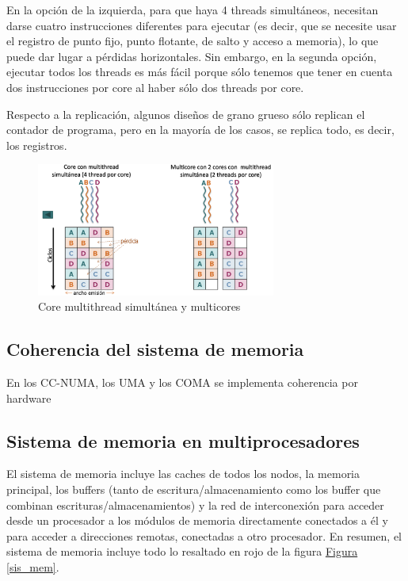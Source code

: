 \documentclass[10pt,a4paper,spanish]{report}
\begin{document}
En la opción de la izquierda, para que haya 4 threads simultáneos, necesitan darse cuatro instrucciones diferentes para ejecutar (es decir, que se necesite usar el registro de punto fijo, punto flotante, de salto y acceso a memoria), lo que puede dar lugar a pérdidas horizontales. Sin embargo, en la segunda opción, ejecutar todos los threads es más fácil porque sólo tenemos que tener en cuenta dos instrucciones por core al haber sólo dos threads por core.

Respecto a la replicación, algunos diseños de grano grueso sólo replican el contador de programa, pero en la mayoría de los casos, se replica todo, es decir, los registros.

\begin{figure}[!h]
\centering
\includegraphics[width=0.7\textwidth]{66}
\caption{Core multithread simultánea y multicores}
\label{cuatro_vs_dos}
\end{figure}

\textcolor[rgb]{0.2,0.4,0.8}{\section{Coherencia del sistema de memoria}}

En los CC-NUMA, los UMA y los COMA se implementa coherencia por hardware

\textcolor[rgb]{0.2,0.4,0.8}{\subsection{Sistema de memoria en multiprocesadores}}
El sistema de memoria incluye las caches de todos los nodos, la memoria principal, los buffers (tanto de escritura/almacenamiento como los buffer que combinan escrituras/almacenamientos) y la red de interconexión para acceder desde un procesador a los módulos de memoria directamente conectados a él y para acceder a direcciones remotas, conectadas a otro procesador. En resumen, el sistema de memoria incluye todo lo resaltado en rojo de la figura \hyperref[sis_mem]{Figura \ref*{sis_mem}}.
\end{document}
